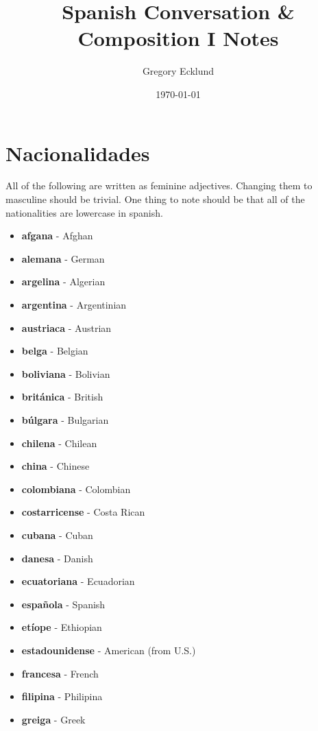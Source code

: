 \documentclass[12pt]{article}
\title{Spanish Conversation \& Composition I Notes}
\author{Gregory Ecklund}
\date{\today}
\begin{document}
    \maketitle
    \tableofcontents
    \newpage

    \section{Nacionalidades}
        All of the following are written as feminine adjectives. Changing them to masculine should be trivial.
        One thing to note should be that all of the nationalities are lowercase in spanish.
        \begin{itemize}
            \item \textbf{afgana} - Afghan
            \item \textbf{alemana} - German
            \item \textbf{argelina} - Algerian
            \item \textbf{argentina} - Argentinian
            \item \textbf{austriaca} - Austrian
            \item \textbf{belga} - Belgian
            \item \textbf{boliviana} - Bolivian
            \item \textbf{británica} - British
            \item \textbf{búlgara} - Bulgarian
            \item \textbf{chilena} - Chilean
            \item \textbf{china} - Chinese
            \item \textbf{colombiana} - Colombian
            \item \textbf{costarricense} - Costa Rican
            \item \textbf{cubana} - Cuban
            \item \textbf{danesa} - Danish
            \item \textbf{ecuatoriana} - Ecuadorian
            \item \textbf{española} - Spanish
            \item \textbf{etíope} - Ethiopian
            \item \textbf{estadounidense} - American (from U.S.)
            \item \textbf{francesa} - French
            \item \textbf{filipina} - Philipina
            \item \textbf{greiga} - Greek

\end{itemize}
\end{document}
